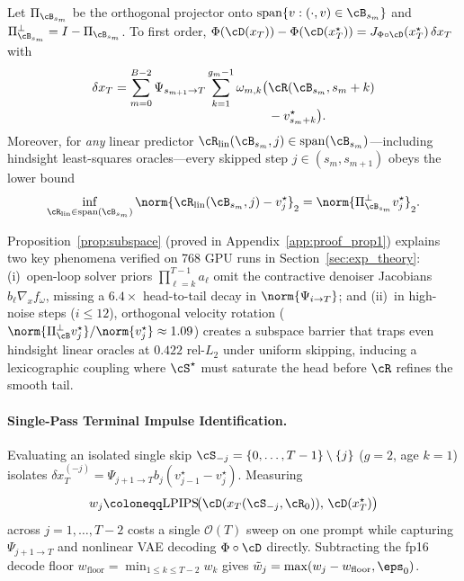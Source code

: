 \begin{proposition}
\label{prop:subspace}
Let $\Pi_{\cB_{s_m}}$ be the orthogonal projector onto $\mathrm{span}\{v : (\cdot, v) \in \cB_{s_m}\}$ and $\Pi_{\cB_{s_m}}^\perp = I - \Pi_{\cB_{s_m}}$. To first order, $\Phi(\cD(x_T)) - \Phi(\cD(x_T^\star)) = J_{\Phi \circ \cD}(x_T^\star)\,\delta x_T$ with
\begin{equation}
\begin{aligned}
\delta x_T = \sum_{m=0}^{B-2} \Psi_{s_{m+1} \to T} \sum_{k=1}^{g_m - 1} \omega_{m,k} \bigl(&\cR(\cB_{s_m}, s_m + k) \\[-3pt]
&- v_{s_m+k}^\star\bigr).
\end{aligned}
\label{eq:adjoint_sum}
\end{equation}
Moreover, for \emph{any} linear predictor $\cR_{\mathrm{lin}}(\cB_{s_m}, j) \in \mathrm{span}(\cB_{s_m})$---including hindsight least-squares oracles---every skipped step $j \in (s_m, s_{m+1})$ obeys the lower bound
\begin{equation}
\inf_{\cR_{\mathrm{lin}} \in \mathrm{span}(\cB_{s_m})} \norm{\cR_{\mathrm{lin}}(\cB_{s_m}, j) - v_j^\star}_2 = \norm{\Pi_{\cB_{s_m}}^\perp v_j^\star}_2.
\label{eq:subspace_floor}
\end{equation}
\end{proposition}

Proposition~\ref{prop:subspace} (proved in Appendix~\ref{app:proof_prop1}) explains two key phenomena verified on 768 GPU runs in Section~\ref{sec:exp_theory}: (i)~open-loop solver priors $\prod_{\ell=k}^{T-1} a_\ell$ omit the contractive denoiser Jacobians $b_\ell \nabla_x f_\omega$, missing a $6.4\times$ head-to-tail decay in $\norm{\Psi_{i\to T}}$; and (ii)~in high-noise steps ($i \le 12$), orthogonal velocity rotation ($\norm{\Pi_{\cB}^\perp v_j^\star}/\norm{v_j^\star} \approx 1.09$) creates a subspace barrier that traps even hindsight linear oracles at $0.422$ rel-$L_2$ under uniform skipping, inducing a lexicographic coupling where $\cS^\star$ must saturate the head before $\cR$ refines the smooth tail.

\paragraph{Single-Pass Terminal Impulse Identification.}
Evaluating an isolated single skip $\cS_{-j} = \{0,\dots,T-1\} \setminus \{j\}$ ($g = 2$, age $k = 1$) isolates $\delta x_T^{(-j)} = \Psi_{j+1 \to T} b_j (v_{j-1}^\star - v_j^\star)$. Measuring
\begin{equation}
w_j \coloneqq \mathrm{LPIPS}\!\bigl(\cD(x_T(\cS_{-j}, \cR_0)),\, \cD(x_T^\star)\bigr)
\label{eq:impulse}
\end{equation}
across $j = 1, \dots, T-2$ costs a single $\mathcal{O}(T)$ sweep on one prompt while capturing $\Psi_{j+1\to T}$ and nonlinear VAE decoding $\Phi \circ \cD$ directly. Subtracting the fp16 decode floor $w_{\mathrm{floor}} = \min_{1 \le k \le T-2} w_k$ gives $\tilde{w}_j = \max(w_j - w_{\mathrm{floor}}, \eps_0)$.
